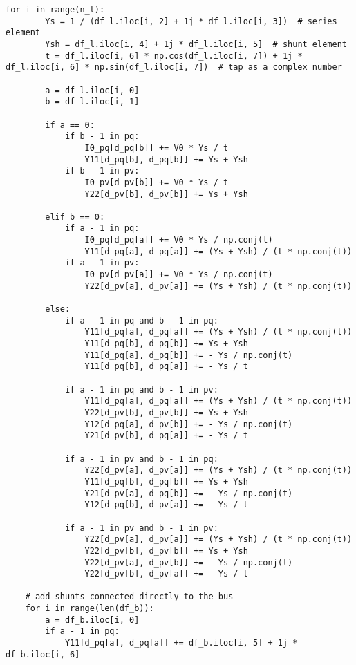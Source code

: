 \begin{lstlisting}[caption={Proper Generalized Decomposition code in Python}]
    for i in range(n_l):
        Ys = 1 / (df_l.iloc[i, 2] + 1j * df_l.iloc[i, 3])  # series element
        Ysh = df_l.iloc[i, 4] + 1j * df_l.iloc[i, 5]  # shunt element
        t = df_l.iloc[i, 6] * np.cos(df_l.iloc[i, 7]) + 1j * df_l.iloc[i, 6] * np.sin(df_l.iloc[i, 7])  # tap as a complex number

        a = df_l.iloc[i, 0]
        b = df_l.iloc[i, 1]

        if a == 0:
            if b - 1 in pq:
                I0_pq[d_pq[b]] += V0 * Ys / t
                Y11[d_pq[b], d_pq[b]] += Ys + Ysh
            if b - 1 in pv:
                I0_pv[d_pv[b]] += V0 * Ys / t
                Y22[d_pv[b], d_pv[b]] += Ys + Ysh

        elif b == 0:
            if a - 1 in pq:
                I0_pq[d_pq[a]] += V0 * Ys / np.conj(t)
                Y11[d_pq[a], d_pq[a]] += (Ys + Ysh) / (t * np.conj(t))
            if a - 1 in pv:
                I0_pv[d_pv[a]] += V0 * Ys / np.conj(t)
                Y22[d_pv[a], d_pv[a]] += (Ys + Ysh) / (t * np.conj(t))

        else:
            if a - 1 in pq and b - 1 in pq:
                Y11[d_pq[a], d_pq[a]] += (Ys + Ysh) / (t * np.conj(t))
                Y11[d_pq[b], d_pq[b]] += Ys + Ysh
                Y11[d_pq[a], d_pq[b]] += - Ys / np.conj(t)
                Y11[d_pq[b], d_pq[a]] += - Ys / t

            if a - 1 in pq and b - 1 in pv:
                Y11[d_pq[a], d_pq[a]] += (Ys + Ysh) / (t * np.conj(t))
                Y22[d_pv[b], d_pv[b]] += Ys + Ysh
                Y12[d_pq[a], d_pv[b]] += - Ys / np.conj(t)
                Y21[d_pv[b], d_pq[a]] += - Ys / t

            if a - 1 in pv and b - 1 in pq:
                Y22[d_pv[a], d_pv[a]] += (Ys + Ysh) / (t * np.conj(t))
                Y11[d_pq[b], d_pq[b]] += Ys + Ysh
                Y21[d_pv[a], d_pq[b]] += - Ys / np.conj(t)
                Y12[d_pq[b], d_pv[a]] += - Ys / t

            if a - 1 in pv and b - 1 in pv:
                Y22[d_pv[a], d_pv[a]] += (Ys + Ysh) / (t * np.conj(t))
                Y22[d_pv[b], d_pv[b]] += Ys + Ysh
                Y22[d_pv[a], d_pv[b]] += - Ys / np.conj(t)
                Y22[d_pv[b], d_pv[a]] += - Ys / t

    # add shunts connected directly to the bus
    for i in range(len(df_b)):
        a = df_b.iloc[i, 0]
        if a - 1 in pq:
            Y11[d_pq[a], d_pq[a]] += df_b.iloc[i, 5] + 1j * df_b.iloc[i, 6]


\end{lstlisting}

